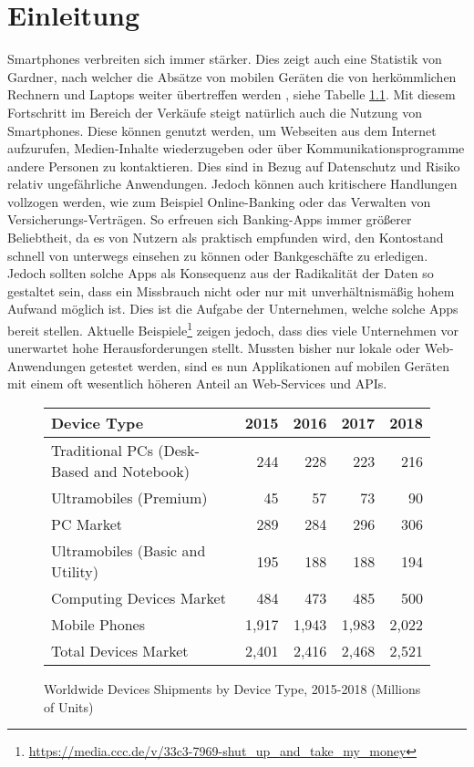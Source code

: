\chapter{Einleitung}
Smartphones verbreiten sich immer stärker. Dies zeigt auch eine Statistik von Gardner, nach welcher die Absätze von mobilen Geräten die von herkömmlichen Rechnern und Laptops weiter übertreffen werden \cite{GartnerSales}, siehe Tabelle \ref{ref:GartnerSalesTable}. Mit diesem Fortschritt im Bereich der Verkäufe steigt natürlich auch die Nutzung von Smartphones. Diese können genutzt werden, um Webseiten aus dem Internet aufzurufen, Medien-Inhalte wiederzugeben oder über Kommunikationsprogramme andere Personen zu kontaktieren. Dies sind in Bezug auf Datenschutz und Risiko relativ ungefährliche Anwendungen. Jedoch können auch kritischere Handlungen vollzogen werden, wie zum Beispiel Online-Banking oder das Verwalten von Versicherungs-Verträgen. So erfreuen sich Banking-Apps immer größerer Beliebtheit, da es von Nutzern als praktisch empfunden wird, den Kontostand schnell von unterwegs einsehen zu können oder Bankgeschäfte zu erledigen. Jedoch sollten solche Apps als Konsequenz aus der Radikalität der Daten so gestaltet sein, dass ein Missbrauch nicht oder nur mit unverhältnismäßig hohem Aufwand möglich ist. Dies ist die Aufgabe der Unternehmen, welche solche Apps bereit stellen. Aktuelle Beispiele\footnote{\url{https://media.ccc.de/v/33c3-7969-shut_up_and_take_my_money}} zeigen jedoch, dass dies viele Unternehmen vor unerwartet hohe Herausforderungen stellt. Mussten bisher nur lokale oder Web-Anwendungen getestet werden, sind es nun Applikationen auf mobilen Geräten mit einem oft wesentlich höheren Anteil an Web-Services und APIs.\\

\begin{figure}[htbp]
	\centering
	\begin{tabular}{ l r r r r}
		Device Type & 2015 & 2016 & 2017 & 2018 \\ \hline
		Traditional PCs (Desk-Based and Notebook) & 244 & 228 & 223 & 216 \\
		Ultramobiles (Premium) & 45 & 57 & 73 & 90 \\
		PC Market & 289 & 284 & 296 & 306 \\
		Ultramobiles (Basic and Utility) & 195 & 188 & 188 & 194 \\
		Computing Devices Market & 484 & 473 & 485 & 500 \\
		Mobile Phones & 1,917 & 1,943 & 1,983 & 2,022 \\
		Total Devices Market & 2,401 & 2,416 & 2,468 & 2,521 \\
	\end{tabular}
	\caption{Worldwide Devices Shipments by Device Type, 2015-2018 (Millions of Units)\cite{GartnerSales}}
	\label{ref:GartnerSalesTable}
\end{figure}

